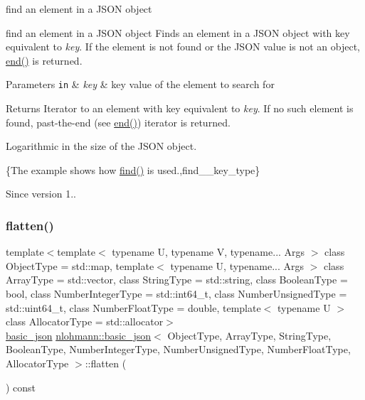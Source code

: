 find an element in a J\+S\+ON object 

find an element in a J\+S\+ON object Finds an element in a J\+S\+ON object with key equivalent to {\itshape key}. If the element is not found or the J\+S\+ON value is not an object, \hyperlink{classnlohmann_1_1basic__json_a12ccf14d39ddae52f6c7e126105a230b}{end()} is returned.


\begin{DoxyParams}[1]{Parameters}
\mbox{\tt in}  & {\em key} & key value of the element to search for\\
\hline
\end{DoxyParams}
\begin{DoxyReturn}{Returns}
Iterator to an element with key equivalent to {\itshape key}. If no such element is found, past-\/the-\/end (see \hyperlink{classnlohmann_1_1basic__json_a12ccf14d39ddae52f6c7e126105a230b}{end()}) iterator is returned.
\end{DoxyReturn}
Logarithmic in the size of the J\+S\+ON object.

\{The example shows how {\ttfamily \hyperlink{classnlohmann_1_1basic__json_affe7e160e7bb06eed83c8b437af4692f}{find()}} is used.,find\+\_\+\+\_\+key\+\_\+type\}

\begin{DoxySince}{Since}
version 1.. 
\end{DoxySince}
\hypertarget{classnlohmann_1_1basic__json_a54d58e56e8a67aaf0c2f3a3a05a76bba}{}\label{classnlohmann_1_1basic__json_a54d58e56e8a67aaf0c2f3a3a05a76bba} 
\subsubsection{\texorpdfstring{flatten()}{flatten()}}
{\footnotesize\ttfamily template$<$template$<$ typename U, typename V, typename... Args $>$ class Object\+Type = std\+::map, template$<$ typename U, typename... Args $>$ class Array\+Type = std\+::vector, class String\+Type  = std\+::string, class Boolean\+Type  = bool, class Number\+Integer\+Type  = std\+::int64\+\_\+t, class Number\+Unsigned\+Type  = std\+::uint64\+\_\+t, class Number\+Float\+Type  = double, template$<$ typename U $>$ class Allocator\+Type = std\+::allocator$>$ \\
\hyperlink{classnlohmann_1_1basic__json}{basic\+\_\+json} \hyperlink{classnlohmann_1_1basic__json}{nlohmann\+::basic\+\_\+json}$<$ Object\+Type, Array\+Type, String\+Type, Boolean\+Type, Number\+Integer\+Type, Number\+Unsigned\+Type, Number\+Float\+Type, Allocator\+Type $>$\+::flatten (\begin{DoxyParamCaption}{ }\end{DoxyParamCaption}) const\hspace{0.3cm}{\ttfamily [inline]}}



